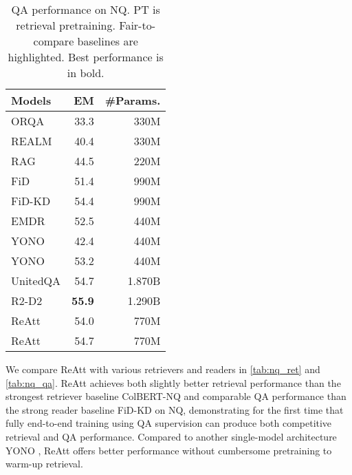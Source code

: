 \documentclass[11pt, dvipsnames]{article}
\def\middlecol{\hskip 6pt}
\newcommand{\ours}{ReAtt\xspace}
\newcommand{\hlrow}{\rowcolor{LightCyan!50}}
\begin{document}
\begin{table}[tb]
\centering
\small
\begin{tabular}{l@{\middlecol}r@{\middlecol}r}
\toprule
\textbf{Models} & \textbf{EM} & \textbf{\#Params.} \\
\midrule
ORQA \cite{orqa-2019-lee} & 33.3 & 330M \\
REALM \cite{realm-2020-guu} & 40.4 & 330M \\
RAG \cite{rag-2020-lewis} & 44.5 & 220M \\
\hlrow FiD \cite{fid-2021-izacard} & 51.4 & 990M \\
\hlrow FiD-KD \cite{fid-kd-2021-izacard} & 54.4 & 990M \\
\hlrow EMDR \cite{emdr2-2021-sachan} & 52.5 & 440M \\
\hlrow YONO \cite{yono-2021-lee} & 42.4 & 440M \\
\hlrow YONO \cite{yono-2021-lee} & 53.2 & 440M \\
UnitedQA \cite{unitedqa-2021-cheng} & 54.7 & 1.870B\space\space \\
R2-D2 \cite{r2d2-2021-fajcik} & \textbf{55.9} & 1.290B\space\space \\
\ours & 54.0 & 770M \\
\ours & 54.7 & 770M \\
\bottomrule
\end{tabular}
\caption{QA performance on NQ. PT is retrieval pretraining. Fair-to-compare baselines are highlighted. Best performance is in bold.}
\label{tab:nq_qa}
\end{table}

We compare \ours with various retrievers and readers in \autoref{tab:nq_ret} and \autoref{tab:nq_qa}.
\ours achieves both slightly better retrieval performance than the strongest retriever baseline ColBERT-NQ \cite{colbertnq-2020-khattab} and comparable QA performance than the strong reader baseline FiD-KD \cite{fid-kd-2021-izacard} on NQ, demonstrating for the first time that fully end-to-end training using QA supervision can produce both competitive retrieval and QA performance.
Compared to another single-model architecture YONO \cite{yono-2021-lee}, \ours offers better performance without cumbersome pretraining to warm-up retrieval.
\end{document}
